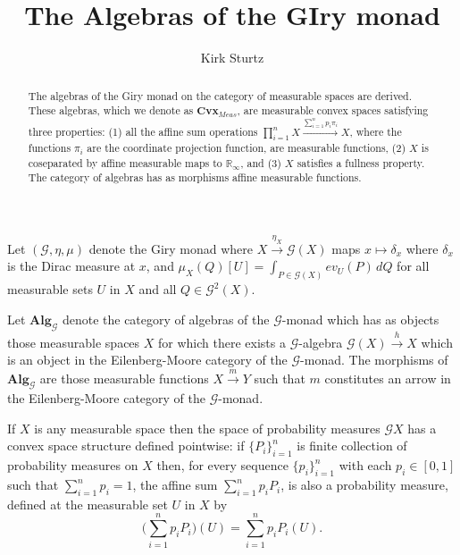 \documentclass[11pt]{amsart}    %
\title{The Algebras of the GIry monad}
\author{Kirk Sturtz}
\newcommand{\Rinf}{\mathbb{R}_{\infty}}
\newcommand{\G}{\mathcal{G}}
\begin{document}
\maketitle

\begin{abstract}
The algebras of the Giry monad on the category of measurable spaces are derived.  These algebras, which we denote as $\mathbf{Cvx}_{Meas}$,  are measurable convex spaces satisfying three properties: (1) all the affine sum operations $\prod_{i=1}^n X \xrightarrow{\sum_{i=1}^n p_i \pi_i} X$, where the functions $\pi_i$ are the coordinate projection function, are measurable functions,  (2) $X$ is coseparated by affine measurable maps to $\Rinf$, and (3) $X$ satisfies a fullness property.  The category of algebras has as morphisms affine measurable functions.
\end{abstract}

\vspace{.2in}

 Let $(\G, \eta, \mu)$ denote the Giry monad where $X \xrightarrow{\eta_X} \G(X)$ maps $x \mapsto \delta_x$ where $\delta_x$ is the Dirac measure at $x$, and $\mu_X(Q)[U] = \int_{P \in \G(X)} ev_U(P) 
\, dQ$ for all measurable sets $U$ in $X$ and all $Q \in \G^2(X)$.

Let $\mathbf{Alg}_{\G}$ denote the category of algebras of the $\G$-monad which has as objects those measurable spaces $X$ for which there exists a $\G$-algebra $\G(X) \xrightarrow{h} X$ which is an object in the Eilenberg-Moore category of the $\G$-monad. The morphisms of $\mathbf{Alg}_{\G}$ are those measurable functions $X \xrightarrow{m} Y$ such that $m$ constitutes an arrow in the Eilenberg-Moore category of the $\G$-monad. 
   
If $X$ is any measurable space then the space of probability measures $\G{X}$ has a convex space structure defined pointwise: if $\{P_i\}_{i=1}^{n}$ is finite collection of probability measures on $X$  then, for every sequence $\{p_i\}_{i=1}^{n}$ with each $p_i \in [0,1]$ such that $\sum_{i=1}^{n} p_i = 1$, the affine sum  $\sum_{i=1}^{n} p_i P_i$,  is also a probability measure, defined at the measurable set $U$ in $X$ by
\begin{equation}
\big(\sum_{i=1}^{n} p_i P_i\big)(U) = \sum_{i=1}^{n} p_i P_i(U).
\end{equation}
\end{document}
